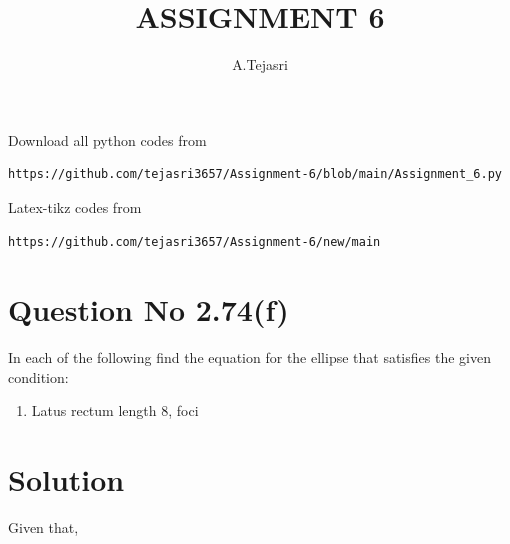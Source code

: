 \documentclass[journal,12pt,twocolumn]{IEEEtran}
\begin{document}
     \def\rightbox#1{\makebox[0in][r]{#1}}
     \def\centbox#1{\makebox[0in]{#1}}
     \def\topbox#1{\raisebox{-\baselineskip}[0in][0in]{#1}}
     \def\midbox#1{\raisebox{-0.5\baselineskip}[0in][0in]{#1}}
\vspace{3cm}
\title{ASSIGNMENT 6}
\author{A.Tejasri}
\maketitle
\newpage
\bigskip
\renewcommand{\thefigure}{\theenumi}
\renewcommand{\thetable}{\theenumi}
Download all python codes from 
\begin{lstlisting}
https://github.com/tejasri3657/Assignment-6/blob/main/Assignment_6.py
\end{lstlisting}
%
Latex-tikz codes from 
%
\begin{lstlisting}
https://github.com/tejasri3657/Assignment-6/new/main
\end{lstlisting}
%
\section{Question No 2.74(f)}
In each of the following find the equation for the ellipse that satisfies the given condition:
\begin{enumerate}
\item Latus rectum length 8,
foci 
\end{enumerate}
%
\section{Solution}
Given that,
\end{document}
